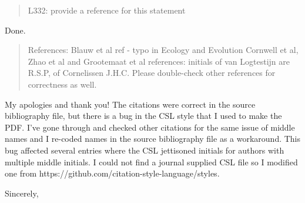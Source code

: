 \documentclass[letterpaper, 12pt]{letter}
\begin{document}
\begin{letter}{}
\begin{quote}
  L332: provide a reference for this statement
\end{quote}

Done.

\begin{quote}
References: Blauw et al ref - typo in Ecology and Evolution
Cornwell et al, Zhao et al and Grootemaat et al references: initials of van Logtestijn are R.S.P, of Cornelissen J.H.C. Please double-check other references for correctness as well.
\end{quote}

My apologies and thank you! The citations were correct in the source bibliography file, but there is a bug in the CSL style that I used to make the PDF. I've gone through and checked other citations for the same issue of middle names and I re-coded names in the source bibliography file as a workaround. This bug affected several entries where the CSL jettisoned initials for authors with multiple middle initials. I could not find a journal supplied CSL file so I modified one from https://github.com/citation-style-language/styles.


\closing{Sincerely,}

\end{letter}
\end{document}
